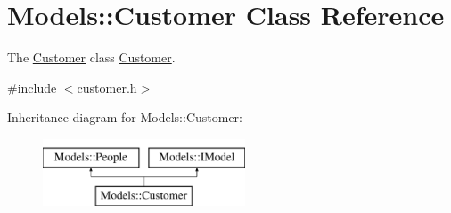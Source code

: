 \hypertarget{classModels_1_1Customer}{\section{Models\-:\-:Customer Class Reference}
\label{classModels_1_1Customer}
}


The \hyperlink{classModels_1_1Customer}{Customer} class \hyperlink{classModels_1_1Customer}{Customer}.  




{\ttfamily \#include $<$customer.\-h$>$}

Inheritance diagram for Models\-:\-:Customer\-:\begin{figure}[H]
\begin{center}
\leavevmode
\includegraphics[height=2.000000cm]{db/dd7/classModels_1_1Customer}
\end{center}
\end{figure}
